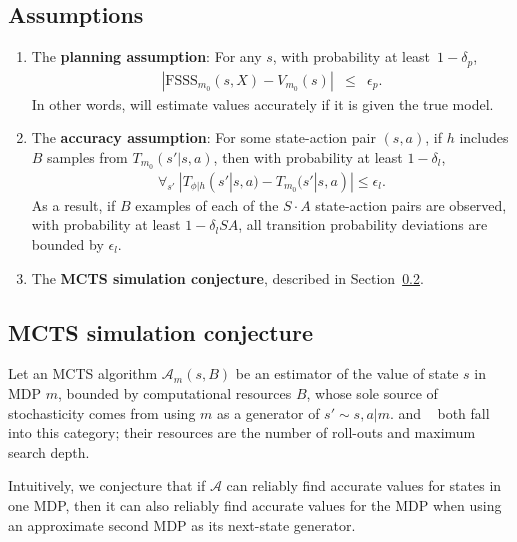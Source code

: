 \subsection{Assumptions}
\begin{enumerate}
\item \label{fsss-acc} The {\bf planning assumption}: For any $s$, with probability at least\ $1-\delta_p$, 
\begin{eqnarray}
|\mbox{FSSS}_{m_0}(s, X)-V_{m_0}(s)| &\leq& \epsilon_p.
\end{eqnarray}
In other words,  will estimate values accurately if it is given the true model.
\item \label{sa-bound} The {\bf accuracy assumption}: For some state-action pair $(s,a)$, if $h$ includes $B$ samples from $T_{m_0}(s'|s,a)$, then with probability at least $1-\delta_l$,
\begin{eqnarray}
\forall_{s'}~|T_{\phi|h}(s'|s,a) - T_{m_0}(s'|s,a)| \leq \epsilon_l.
\end{eqnarray}
As a result, if $B$ examples of each of the $S\cdot A$ state-action pairs are observed, with probability at least $1-\delta_l S A$, all transition probability deviations are bounded by $\epsilon_l$.

\item The {\bf MCTS simulation conjecture}, described in Section~\ref{mcts-conj}.
\end{enumerate}



\subsection{MCTS simulation conjecture}
\label{mcts-conj}

Let an MCTS algorithm $\mathcal{A}_m(s,B)$ be an estimator of the value of state $s$ in MDP $m$, bounded by computational resources $B$, whose sole source of stochasticity comes from using $m$ as a generator of $s'\sim s,a|m$.  and ~\cite{kocsis06} both fall into this category; their resources are the number of roll-outs and maximum search depth.

Intuitively, we conjecture that if $\mathcal{A}$ can reliably find accurate values for states in one MDP, then it can also reliably find accurate values for the MDP when using an approximate second MDP as its next-state generator.

